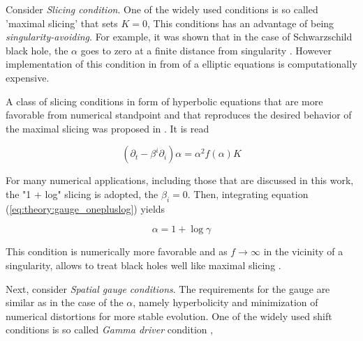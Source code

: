 \documentclass[11pt,a4paper,headinclude=true,DIV=14,BCOR=8mm,chapterprefix,listof=totoc,twoside,openright,abstracton]{scrbook}
\begin{document}
Consider \textit{Slicing condition}. One of the widely used conditions is so called 'maximal slicing' that sets $K=0$, 
This conditions has an advantage of being \textit{singularity-avoiding}. For example, it was shown that in the case of Schwarzschild black hole, the $\alpha$ goes to zero at a finite distance from singularity \cite{Geyer:1995}. However implementation of this condition in from of a elliptic equations is computationally expensive.

A class of slicing conditions in form of hyperbolic equations that are more favorable from numerical standpoint and that reproduces the desired behavior of the maximal slicing was proposed in \cite{Bona:1994dr}. It is read 

\begin{equation}
(\partial_t - \beta^i\partial_i)\alpha = \alpha^2 f(\alpha)K
\label{eq:theory:gauge_onepluslog}
\end{equation}

%

For many numerical applications, including those that are discussed in this work, the "1 + log" slicing is adopted, the $\beta_i=0$. 
Then, integrating equation (\ref{eq:theory:gauge_onepluslog}) yields 

\begin{equation}
\alpha = 1 + \log\gamma
\end{equation}

This condition is numerically more favorable and as $f\rightarrow\infty$ in the vicinity of a singularity, allows to treat black holes well like maximal slicing \cite{Baumgarte:2002jm}.

Next, consider \textit{Spatial gauge conditions}.
The requirements for the gauge are similar as in the case of the $\alpha$, namely hyperbolicity and minimization of numerical distortions for more stable evolution.  
One of the widely used shift conditions is so called \textit{Gamma driver} condition \cite{Alcubierre:2002kk}, 
\end{document}
